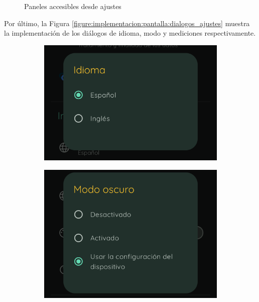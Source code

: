 \begin{figure}[htbp]
\begin{subfigure}[c]{0.29\textwidth}
                	\end{subfigure}
                	\caption{Paneles accesibles desde ajustes}
                	\label{figure:implementacion:pantalla:paneles_ajustes}
                \end{figure}

                Por último, la Figura \ref{figure:implementacion:pantalla:dialogos_ajustes} muestra la implementación de los diálogos de idioma, modo y mediciones respectivamente.

                \begin{figure}[htbp]
                	\centering
                	\begin{subfigure}[c]{0.29\textwidth}
                		\centering
                		\includegraphics[width=1\textwidth]{figures/pantallas/Ajuste idioma.png}
                	\end{subfigure}
                	\hspace{0.05\textwidth}
                	\begin{subfigure}[c]{0.29\textwidth}
                		\centering
                		\includegraphics[width=1\linewidth]{figures/pantallas/Ajuste modo.png}

\end{subfigure}
\end{figure}
